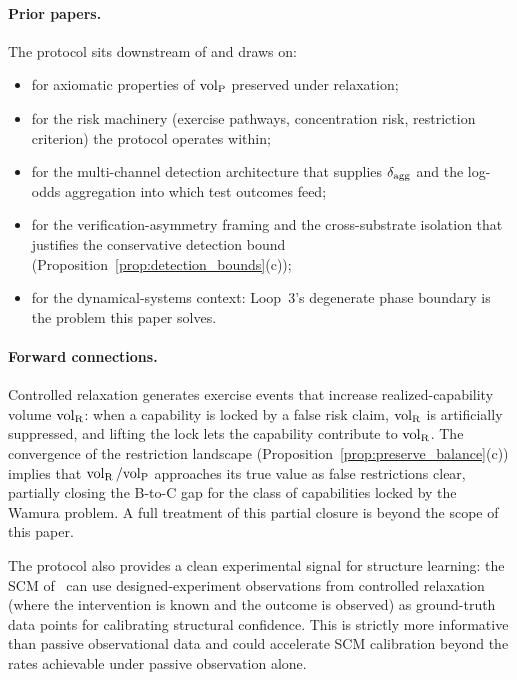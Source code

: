 \paragraph{Prior papers.}
The protocol sits downstream of and draws on:
\begin{itemize}
\item \citet{lasser2026poset} for axiomatic properties of
  ${\operatorname{vol}_{\mathrm{P}}}$ preserved under relaxation;
\item \citet{lasser2026horizon} for the risk machinery (exercise
  pathways, concentration risk, restriction criterion) the
  protocol operates within;
\item \citet{lasser2026scm} for the multi-channel detection
  architecture that supplies $\delta_{\mathrm{agg}}$ and the log-odds
  aggregation into which test outcomes feed;
\item \citet{lasser2026exo} for the verification-asymmetry
  framing and the cross-substrate isolation that justifies the
  conservative detection bound
  (Proposition~\ref{prop:detection_bounds}(c));
\item \citet{lasser2026phase} for the dynamical-systems context:
  Loop~3's degenerate phase boundary is the problem this paper
  solves.
\end{itemize}

\paragraph{Forward connections.}
Controlled relaxation generates exercise events that increase
realized-capability volume $\operatorname{vol}_{\mathrm{R}}$: when a capability
is locked by a false risk claim, $\operatorname{vol}_{\mathrm{R}}$ is
artificially suppressed, and lifting the lock lets the
capability contribute to $\operatorname{vol}_{\mathrm{R}}$.  The convergence
of the restriction landscape
(Proposition~\ref{prop:preserve_balance}(c)) implies that
$\operatorname{vol}_{\mathrm{R}} / {\operatorname{vol}_{\mathrm{P}}}$ approaches its true value as false
restrictions clear, partially closing the B-to-C gap for the
class of capabilities locked by the Wamura problem.  A full
treatment of this partial closure is beyond the scope of this
paper.

The protocol also provides a clean experimental signal for
structure learning: the SCM
of~\citep[Definition~1]{lasser2026scm} can use designed-experiment
observations from controlled relaxation (where the intervention
is known and the outcome is observed) as ground-truth data
points for calibrating structural confidence.  This is strictly
more informative than passive observational data and could
accelerate SCM calibration beyond the rates achievable under
passive observation alone.
